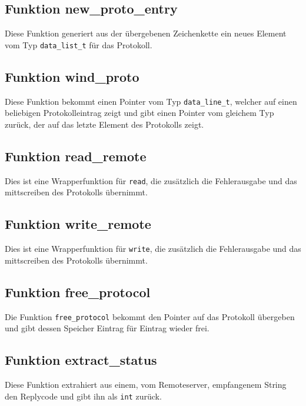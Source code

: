 \documentclass[pdftex,final,a4paper,10pt,notitlepage,halfparskip]{scrreprt}
\begin{document}
\subsection{Funktion new\_proto\_entry}\label{fn:new_proto_entry}
Diese Funktion generiert aus der übergebenen Zeichenkette ein neues Element vom Typ \texttt{data\_list\_t} für das Protokoll.

\subsection{Funktion wind\_proto}\label{fn:wind_proto}
Diese Funktion bekommt einen Pointer vom Typ \texttt{data\_line\_t}, welcher auf einen beliebigen Protokolleintrag zeigt und gibt einen Pointer vom gleichem Typ zurück, der auf das letzte Element des Protokolls zeigt.

\subsection{Funktion read\_remote}\label{fn:read_remote}
Dies ist eine Wrapperfunktion für \texttt{read}, die zusätzlich die Fehlerausgabe und das mittscreiben des Protokolls übernimmt.

\subsection{Funktion write\_remote}\label{fn:write_remote}
Dies ist eine Wrapperfunktion für \texttt{write}, die zusätzlich die Fehlerausgabe und das mittscreiben des Protokolls übernimmt.

\subsection{Funktion free\_protocol}\label{fn:free_protocol}
Die Funktion \texttt{free\_protocol} bekommt den Pointer auf das Protokoll übergeben und gibt dessen Speicher Eintrag für Eintrag wieder frei.

\subsection{Funktion extract\_status}\label{fn:extract_status}
Diese Funktion extrahiert aus einem, vom Remoteserver, empfangenem String den Replycode und gibt ihn als \texttt{int} zurück.
\end{document}
